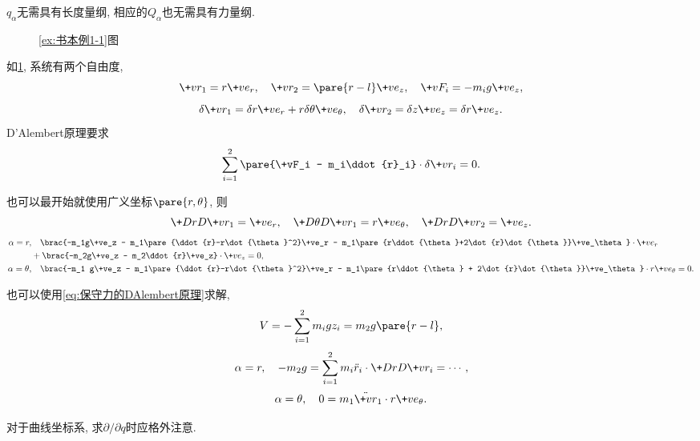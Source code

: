 \documentclass[../LectureNotes.tex]{subfiles}
\begin{document}
\begin{pitfall}
    $q_\alpha$无需具有长度量纲, 相应的$Q_\alpha$也无需具有力量纲.
\end{pitfall}
\begin{figure}[ht]
    \centering
    \caption{\cref{ex:书本例1-1}图}
    \label{fig:书本例1-1图}
\end{figure}
\begin{sample}
    \begin{ex}
        \label{ex:书本例1-1}
        如\cref{fig:书本例1-1图}, 系统有两个自由度,
        \[ \+vr_1 = r\+ve_r,\quad \+vr_2 = \pare{r-l}\+ve_z,\quad \+vF_i = -m_ig\+ve_z, \]
        \[ \delta \+vr_1 = \delta r\+ve_r + r\delta\theta\+ve_\theta,\quad \delta\+vr_2 = \delta z\+ve_z = \delta r\+ve_z. \]
        D'Alembert原理要求
        \[ \sum_{i=1}^2 \pare{\+vF_i - m_i\ddot{r}_i}\cdot\delta\+vr_i = 0. \]
    \end{ex}
    \begin{ex}
        也可以最开始就使用广义坐标$\pare{r,\theta}$, 则
        \[ \+DrD{\+vr_1} = \+ve_r,\quad \+D{\theta}D{\+vr_1} = r\+ve_\theta,\quad \+D{r}D{\+vr_2} = \+ve_z. \]
        \begin{align*}
            \alpha = r,&\quad \brac{-m_1g\+ve_z - m_1\pare{\ddot{r}-r\dot{\theta}^2}\+ve_r - m_1\pare{r\ddot{\theta}+2\dot{r}\dot{\theta}}\+ve_\theta}\cdot\+ve_r\\ &+ \brac{-m_2g\+ve_z - m_2\ddot{r}\+ve_z}\cdot\+ve_z = 0, \\
            \alpha = \theta, &\quad \brac{-m_1 g\+ve_z - m_1\pare{\ddot{r}-r\dot{\theta}^2}\+ve_r - m_1\pare{r\ddot{\theta} + 2\dot{r}\dot{\theta}}\+ve_\theta}\cdot r\+ve_\theta = 0.
        \end{align*}
    \end{ex}
    \begin{ex}
        也可以使用\eqref{eq:保守力的DAlembert原理}求解,
        \[ V = -\sum_{i=1}^2 m_i gz_i = m_2g\pare{r-l}, \]
        \[ \alpha =r,\quad -m_2 g = \sum_{i=1}^2 m_i\ddot{r}_i\cdot\+D{r}D{\+vr_i} = \cdots, \]
        \[ \alpha=\theta,\quad 0 = m_1 \ddot{\+vr}_1 \cdot r\+ve_\theta. \]
    \end{ex}
\end{sample}
\begin{pitfall}
    对于曲线坐标系, 求$\partial/\partial q$时应格外注意.
\end{pitfall}
\end{document}
